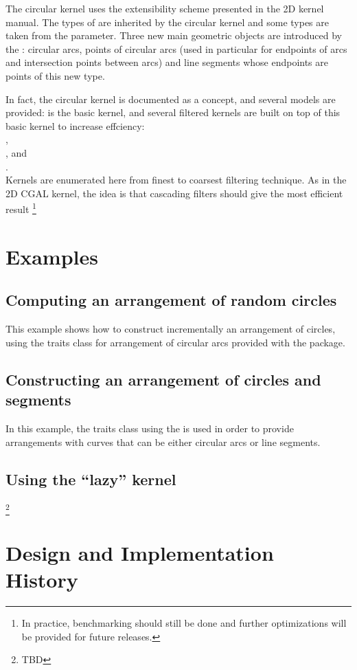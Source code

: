 The circular kernel uses the extensibility scheme presented in the 2D
kernel manual. The types of  are inherited
by the circular kernel and some types are taken from the
 parameter. Three new main geometric objects are
introduced by the : circular arcs, points of
circular arcs (used in particular for endpoints of arcs and
intersection points between arcs) and line segments whose endpoints
are points of this new type.  

In fact, the circular kernel is documented as a concept, and several
models are provided:  is the basic kernel, and
several filtered kernels are built on top of this basic kernel to
increase effciency:\\
, \\
, and\\
. \\
Kernels are enumerated here from finest to coarsest filtering
technique. As in the 2D CGAL kernel, the idea is that cascading
filters should give the most efficient result \footnote{In practice,
benchmarking should still be done and further optimizations will be
provided for future releases.}

\section{Examples}

	\subsection{Computing an arrangement of random circles} 

This example shows how to construct incrementally an arrangement of
circles, using the traits class for arrangement of circular arcs
provided with the package.


	\subsection{Constructing an arrangement of circles and segments} 

In this example, the traits class using the
is used in order to provide arrangements with curves that can be
either circular arcs or line segments.


	\subsection{Using the ``lazy'' kernel} 
\footnote{TBD}

\section{Design and Implementation History}
